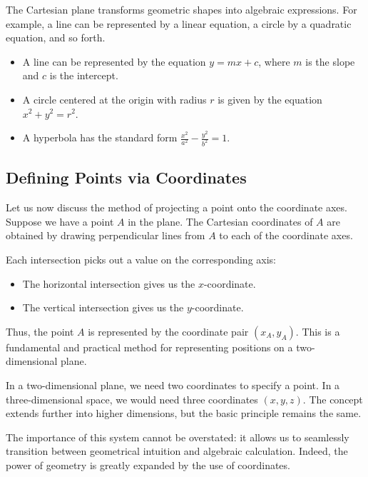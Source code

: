 \documentclass[12pt,a4paper]{article}
\newenvironment{exbox}[1][]{%
  \begin{tcolorbox}[enhanced, breakable, colback=excolor, colframe=brown!50!black, title=#1, fonttitle=\bfseries, arc=3pt, boxrule=0.5pt]
}{\end{tcolorbox}}
\newenvironment{rembox}[1][]{%
  \begin{tcolorbox}[enhanced, breakable, colback=gray!5, colframe=gray!50, title=#1, fonttitle=\bfseries, arc=3pt, boxrule=0.5pt]
}{\end{tcolorbox}}
\begin{document}
The Cartesian plane transforms geometric shapes into algebraic expressions. For example, a line can be represented by a linear equation, a circle by a quadratic equation, and so forth.

\begin{exbox}[Examples of Geometric Shapes in Cartesian Coordinates]
\begin{itemize}
    \item A line can be represented by the equation $y = mx + c$, where $m$ is the slope and $c$ is the intercept.
    \item A circle centered at the origin with radius $r$ is given by the equation $x^2 + y^2 = r^2$.
    \item A hyperbola has the standard form $\frac{x^2}{a^2} - \frac{y^2}{b^2} = 1$.
\end{itemize}
\end{exbox}

\subsection{Defining Points via Coordinates}
Let us now discuss the method of projecting a point onto the coordinate axes. Suppose we have a point $A$ in the plane. The Cartesian coordinates of $A$ are obtained by drawing perpendicular lines from $A$ to each of the coordinate axes.

Each intersection picks out a value on the corresponding axis:
\begin{itemize}
    \item The horizontal intersection gives us the $x$-coordinate.
    \item The vertical intersection gives us the $y$-coordinate.
\end{itemize}

Thus, the point $A$ is represented by the coordinate pair $(x_A, y_A)$. This is a fundamental and practical method for representing positions on a two-dimensional plane.

\begin{rembox}[Dimensionality and Coordinates]
In a two-dimensional plane, we need two coordinates to specify a point. In a three-dimensional space, we would need three coordinates $(x, y, z)$. The concept extends further into higher dimensions, but the basic principle remains the same.
\end{rembox}

The importance of this system cannot be overstated: it allows us to seamlessly transition between geometrical intuition and algebraic calculation. Indeed, the power of geometry is greatly expanded by the use of coordinates.
\end{document}
